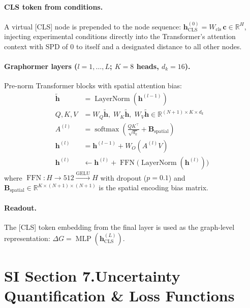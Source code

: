 \documentclass[11pt]{article}
\begin{document}
\paragraph{CLS token from conditions.}
A virtual [CLS] node is prepended to the node sequence:
$\mathbf{h}_{\mathrm{CLS}}^{(0)} = W_{\mathrm{cls}}\, \mathbf{c}
\in \mathbb{R}^{H}$, injecting experimental conditions directly
into the Transformer's attention context with SPD of 0 to itself and
a designated distance to all other nodes.

\paragraph{Graphormer layers ($l = 1, \ldots, L$; $K = 8$ heads, $d_k = 16$).}
Pre-norm Transformer blocks with spatial attention bias:
\begin{align}
  \tilde{\mathbf{h}} &= \operatorname{LayerNorm}(\mathbf{h}^{(l-1)}) \\
  Q, K, V &= W_Q \tilde{\mathbf{h}},\;
  W_K \tilde{\mathbf{h}},\;
  W_V \tilde{\mathbf{h}}
  \in \mathbb{R}^{(N+1) \times K \times d_k} \\
  A^{(l)} &= \operatorname{softmax}\!\left(
    \frac{Q K^\top}{\sqrt{d_k}}
    + \mathbf{B}_{\mathrm{spatial}}
  \right) \\
  \mathbf{h}^{(l)} &= \mathbf{h}^{(l-1)}
  + W_O (A^{(l)} V) \\
  \mathbf{h}^{(l)} &\leftarrow \mathbf{h}^{(l)}
  + \operatorname{FFN}\!\bigl(
    \operatorname{LayerNorm}(\mathbf{h}^{(l)})
  \bigr) \label{eq:graphormer_ffn}
\end{align}
where $\operatorname{FFN}: H \to 512 \xrightarrow{\mathrm{GELU}} H$
with dropout ($p = 0.1$) and
$\mathbf{B}_{\mathrm{spatial}} \in \mathbb{R}^{K \times (N+1) \times (N+1)}$
is the spatial encoding bias matrix.

\paragraph{Readout.}
The [CLS] token embedding from the final layer is used as the
graph-level representation:
$\Delta G = \operatorname{MLP}(\mathbf{h}_{\mathrm{CLS}}^{(L)})$.

\label{si:models_end}

\section*{SI Section 7.\quad Uncertainty Quantification \& Loss Functions}
\label{si:uncertainty}
\end{document}
